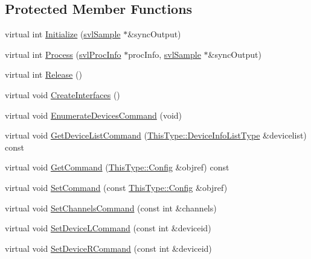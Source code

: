 \subsection*{Protected Member Functions}
\begin{DoxyCompactItemize}
\item 
virtual int \hyperlink{classsvl_filter_source_video_capture_a1da5704a88657e2e84d8215fcbe9e2c3}{Initialize} (\hyperlink{classsvl_sample}{svl\+Sample} $\ast$\&sync\+Output)
\item 
virtual int \hyperlink{classsvl_filter_source_video_capture_a6910f1c5144a593ecd7bfd713944730e}{Process} (\hyperlink{structsvl_proc_info}{svl\+Proc\+Info} $\ast$proc\+Info, \hyperlink{classsvl_sample}{svl\+Sample} $\ast$\&sync\+Output)
\item 
virtual int \hyperlink{classsvl_filter_source_video_capture_a004ca0768d12f5bf38eff0b6274f2beb}{Release} ()
\item 
virtual void \hyperlink{classsvl_filter_source_video_capture_a2fd59f93d8c5e44e67c9dcce01514edd}{Create\+Interfaces} ()
\item 
virtual void \hyperlink{classsvl_filter_source_video_capture_aa910918889f8432791329274497a69d4}{Enumerate\+Devices\+Command} (void)
\item 
virtual void \hyperlink{classsvl_filter_source_video_capture_a50e0b460d69240a109215cae6aa43e5a}{Get\+Device\+List\+Command} (\hyperlink{classsvl_filter_source_video_capture_a52d28d8296c6b85055022a72c69334e4}{This\+Type\+::\+Device\+Info\+List\+Type} \&devicelist) const 
\item 
virtual void \hyperlink{classsvl_filter_source_video_capture_ad5113b583320c5a857766ec6311f2908}{Get\+Command} (\hyperlink{classsvl_filter_source_video_capture_ac541a625ce316b5320170cef3ca02277}{This\+Type\+::\+Config} \&objref) const 
\item 
virtual void \hyperlink{classsvl_filter_source_video_capture_ac506464be36d152e330394bc5598dbf4}{Set\+Command} (const \hyperlink{classsvl_filter_source_video_capture_ac541a625ce316b5320170cef3ca02277}{This\+Type\+::\+Config} \&objref)
\item 
virtual void \hyperlink{classsvl_filter_source_video_capture_ad5362d8c49ab408cc2b2dece5a98dac9}{Set\+Channels\+Command} (const int \&channels)
\item 
virtual void \hyperlink{classsvl_filter_source_video_capture_aee975b68fbf20b1ff832c1cfdfa0b471}{Set\+Device\+L\+Command} (const int \&deviceid)
\item 
virtual void \hyperlink{classsvl_filter_source_video_capture_ac90e7cc9fd637928d42b213a55749a4f}{Set\+Device\+R\+Command} (const int \&deviceid)

\end{DoxyCompactItemize}
